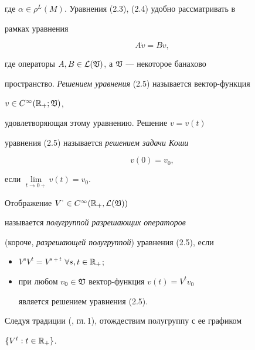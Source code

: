 где $\alpha\in\rho^L(M)$. Уравнения (2.3), (2.4) удобно рассматривать в 


рамках уравнения 


\begin{equation} 


A\Dot v=Bv, 


\end{equation} 


где операторы $A,B\in\cal L(\frak V)$, а $\frak V$ --- некоторое банахово 


пространство. {\it Решением уравнения} (2.5) называется вектор-функция 


$v\in C^\infty(\Bbb R_+;\frak V)$, 


удовлетворяющая этому уравнению. Решение $v=v(t)$ 


уравнения (2.5) называется {\it решением задачи Коши} 


\begin{equation} 


v(0)=v_0, 


\end{equation} 


если $\lim\limits_{t\to 0+}v(t)=v_0$. 


 


\begin{defnm} Отображение $V^{\textstyle\cdot}\in C^\infty(\Bbb R_+,\cal L(\frak V))$ 


называется {\it полугруппой разрешающих операторов} 


(короче, {\it разрешающей полугруппой}) уравнения (2.5), если 


\begin{itemize} 


\item[(i)] $V^sV^t=V^{s+t}$ $\forall s,t\in\Bbb R_+$; 


\item [(ii)] при любом $v_0\in\frak V$ вектор-функция $v(t)=V^tv_0$ 


является решением уравнения (2.5). 


\end{itemize} 


\end{defnm} 


 


Следуя традиции (\cite{Hen}, гл.\,1), отождествим полугруппу с ее графиком 


$\{V^t:t\in\Bbb R_+\}$. 


